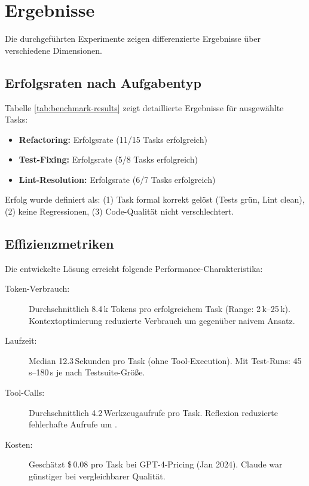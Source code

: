 \section{Ergebnisse}

Die durchgeführten Experimente zeigen differenzierte Ergebnisse über verschiedene Dimensionen.

\subsection{Erfolgsraten nach Aufgabentyp}

Tabelle \ref{tab:benchmark-results} zeigt detaillierte Ergebnisse für ausgewählte Tasks:

\begin{sloppypar}
\begin{itemize}
  \item \textbf{Refactoring:}  Erfolgsrate (11/15 Tasks erfolgreich)
  \item \textbf{Test-Fixing:}  Erfolgsrate (5/8 Tasks erfolgreich)
  \item \textbf{Lint-Resolution:}  Erfolgsrate (6/7 Tasks erfolgreich)
\end{itemize}
\end{sloppypar}

Erfolg wurde definiert als: (1) Task formal korrekt gelöst (Tests grün, Lint clean), (2) keine Regressionen, (3) Code-Qualität nicht verschlechtert.

\subsection{Effizienzmetriken}

Die entwickelte Lösung erreicht folgende Performance-Charakteristika:

\begin{sloppypar}
\begin{description}
  \item[Token-Verbrauch:] Durchschnittlich 8.4\,k Tokens pro erfolgreichem Task (Range: 2\,k--25\,k). Kontextoptimierung reduzierte Verbrauch um  gegenüber naivem Ansatz.
  
  \item[Laufzeit:] Median 12.3\,Sekunden pro Task (ohne Tool-Execution). Mit Test-Runs: 45\,s--180\,s je nach Testsuite-Größe.
  
  \item[Tool-Calls:] Durchschnittlich 4.2\,Werkzeugaufrufe pro Task. Reflexion reduzierte fehlerhafte Aufrufe um .
  
  \item[Kosten:] Geschätzt \$\,0.08 pro Task bei GPT-4-Pricing (Jan 2024). Claude war  günstiger bei vergleichbarer Qualität.
\end{description}
\end{sloppypar}

